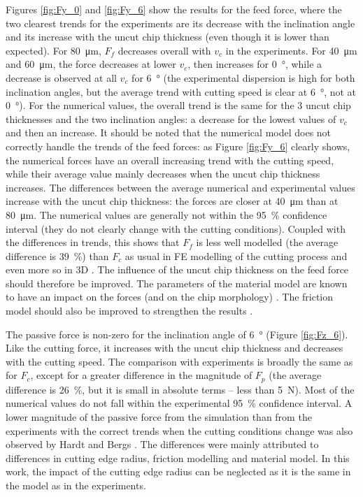 \documentclass[preprint,12pt,times]{elsarticle}
\newcommand{\snsp}[2]{{#1}_{\!#2}}    %
\begin{document}
Figures \ref{fig:Fy_0} and \ref{fig:Fy_6} show the results for the feed force, where the two clearest trends for the experiments are its decrease with the inclination angle and its increase with the uncut chip thickness (even though it is lower than expected). For \qty{80}{\um}, $\snsp{F}{f}$ decreases overall with $v_c$ in the experiments. For \qty{40}{\um} and \qty{60}{\um}, the force decreases at lower $v_c$, then increases for \qty{0}{\degree}, while a decrease is observed at all $v_c$ for \qty{6}{\degree} (the experimental dispersion is high for both inclination angles, but the average trend with cutting speed is clear at \qty{6}{\degree}, not at \qty{0}{\degree}). For the numerical values, the overall trend is the same for the 3 uncut chip thicknesses and the two inclination angles: a decrease for the lowest values of $v_c$ and then an increase. It should be noted that the numerical model does not correctly handle the trends of the feed forces: as Figure \ref{fig:Fy_6} clearly shows, the numerical forces have an overall increasing trend with the cutting speed, while their average value mainly decreases when the uncut chip thickness increases. The differences between the average numerical and experimental values increase with the uncut chip thickness: the forces are closer at \qty{40}{\um} than at \qty{80}{\um}. The numerical values are generally not within the \qty{95}{\%} confidence interval (they do not clearly change with the cutting conditions). Coupled with the differences in trends, this shows that $\snsp{F}{f}$ is less well modelled (the average difference is \qty{39}{\%}) than $\snsp{F}{c}$ as usual in FE modelling of the cutting process and even more so in 3D \cite{hardt_Three_2021}. The influence of the uncut chip thickness on the feed force should therefore be improved. The parameters of the material model are known to have an impact on the forces (and on the chip morphology) \cite{ducobu_Importance_2017,kugalurpalanisamy_Identification_2022}. The friction model should also be improved to strengthen the results \cite{hardt_Three_2021}.

The passive force is non-zero for the inclination angle of \qty{6}{\degree} (Figure \ref{fig:Fz_6}). Like the cutting force, it increases with the uncut chip thickness and decreases with the cutting speed. The comparison with experiments is broadly the same as for $\snsp{F}{c}$, except for a greater difference in the magnitude of $\snsp{F}{p}$ (the average difference is \qty{26}{\%}, but it is small in absolute terms -- less than \qty{5}{N}). Most of the numerical values do not fall within the experimental \qty{95}{\%} confidence interval. A lower magnitude of the passive force from the simulation than from the experiments with the correct trends when the cutting conditions change was also observed by Hardt and Bergs \cite{hardt_Three_2021}. The differences were mainly attributed to differences in cutting edge radius, friction modelling and material model. In this work, the impact of the cutting edge radius can be neglected as it is the same in the model as in the experiments.
\end{document}
